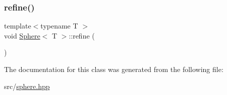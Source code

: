 \mbox{\label{classSphere_a3f5ee2b07e48a360696fe983690d1d1f}} 
\subsubsection{\texorpdfstring{refine()}{refine()}}
{\footnotesize\ttfamily template$<$typename T $>$ \\
void \mbox{\hyperlink{classSphere}{Sphere}}$<$ T $>$\+::refine (\begin{DoxyParamCaption}{ }\end{DoxyParamCaption})}



The documentation for this class was generated from the following file\+:\begin{DoxyCompactItemize}
\item 
src/\mbox{\hyperlink{sphere_8hpp}{sphere.\+hpp}}\end{DoxyCompactItemize}
